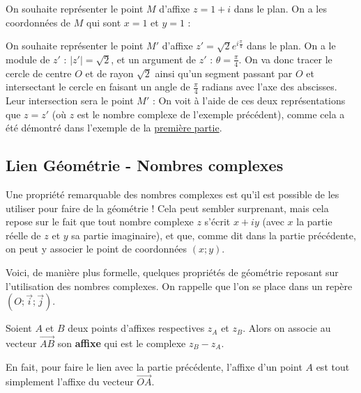 	\begin{tip}[Exemple]
		On souhaite représenter le point $M$ d'affixe $z = 1 + i$ dans le plan. On a les coordonnées de $M$ qui sont $x = 1$ et $y = 1$ :
	\end{tip}
	
	\begin{tip}[Exemple]
		On souhaite représenter le point $M'$ d'affixe $z' = \sqrt{2}e^{i\frac{\pi}{4}}$ dans le plan. On a le module de $z'$ : $|z'| = \sqrt{2}$, et un argument de $z'$ : $\theta = \frac{\pi}{4}$. On va donc tracer le cercle de centre $O$ et de rayon $\sqrt{2}$ ainsi qu'un segment passant par $O$ et intersectant le cercle en faisant un angle de $\frac{\pi}{4}$ radians avec l'axe des abscisses. Leur intersection sera le point $M'$ :
		On voit à l'aide de ces deux représentations que $z = z'$ (où $z$ est le nombre complexe de l'exemple précédent), comme cela a été démontré dans l'exemple de la \hyperref[forme-exponentielle]{première partie}.
	\end{tip}
	
	\subsection{Lien Géométrie - Nombres complexes}
	
	Une propriété remarquable des nombres complexes est qu'il est possible de les utiliser pour faire de la géométrie ! Cela peut sembler surprenant, mais cela repose sur le fait que tout nombre complexe $z$ s'écrit $x + iy$ (avec $x$ la partie réelle de $z$ et $y$ sa partie imaginaire), et que, comme dit dans la partie précédente, on peut y associer le point de coordonnées $(x; y)$.
	
	Voici, de manière plus formelle, quelques propriétés de géométrie reposant sur l'utilisation des nombres complexes. On rappelle que l'on se place dans un repère $(O; \overrightarrow{i}; \overrightarrow{j})$.
	
	\begin{formula}
		Soient $A$ et $B$ deux points d'affixes respectives $z_A$ et $z_B$. Alors on associe au vecteur $\overrightarrow{AB}$ son \textbf{affixe} qui est le complexe $z_B - z_A$.
	\end{formula}
	
	\begin{tip}
		En fait, pour faire le lien avec la partie précédente, l'affixe d'un point $A$ est tout simplement l'affixe du vecteur $\overrightarrow{OA}$.
	\end{tip}
	
